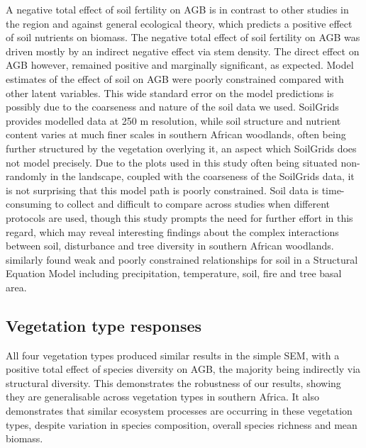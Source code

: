 \documentclass[11pt,a4paper]{article}
\begin{document}
A negative total effect of soil fertility on AGB is in contrast to other studies in the region and against general ecological theory, which predicts a positive effect of soil nutrients on biomass. The negative total effect of soil fertility on AGB was driven mostly by an indirect negative effect via stem density. The direct effect on AGB however, remained positive and marginally significant, as expected. Model estimates of the effect of soil on AGB were poorly constrained compared with other latent variables. This wide standard error on the model predictions is possibly due to the coarseness and nature of the soil data we used. SoilGrids provides modelled data at 250 m resolution, while soil structure and nutrient content varies at much finer scales \citep{Muledi2017, Bucini2007} in southern African woodlands, often being further structured by the vegetation overlying it, an aspect which SoilGrids does not model precisely. Due to the plots used in this study often being situated non-randomly in the landscape, coupled with the coarseness of the SoilGrids data, it is not surprising that this model path is poorly constrained. Soil data is time-consuming to collect and difficult to compare across studies when different protocols are used, though this study prompts the need for further effort in this regard, which may reveal interesting findings about the complex interactions between soil, disturbance and tree diversity in southern African woodlands. \citet{Lehmann2014} similarly found weak and poorly constrained relationships for soil in a Structural Equation Model including precipitation, temperature, soil, fire and tree basal area.

\subsection{Vegetation type responses}

All four vegetation types produced similar results in the simple SEM, with a positive total effect of species diversity on AGB, the majority being indirectly via structural diversity. This demonstrates the robustness of our results, showing they are generalisable across vegetation types in southern Africa. It also demonstrates that similar ecosystem processes are occurring in these vegetation types, despite variation in species composition, overall species richness and mean biomass.
\end{document}
